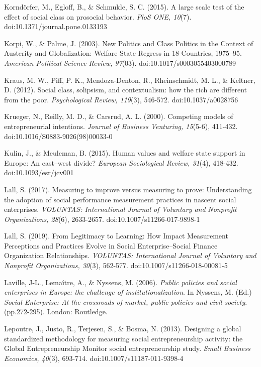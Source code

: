 \documentclass{article}
\begin{document}
Korndörfer, M., Egloff, B., \& Schmukle, S. C. (2015). A large scale test of the effect of social class on prosocial behavior. \emph{PloS}\emph{ ONE, 10}(7). doi:10.1371/journal.pone.0133193

Korpi, W., \& Palme, J. (2003). New Politics and Class Politics in the Context of Austerity and Globalization: Welfare State Regress in 18 Countries, 1975--95. \emph{American Political Science Review, 97}(03). doi:10.1017/s0003055403000789

Kraus, M. W., Piff, P. K., Mendoza-Denton, R., Rheinschmidt, M. L., \& Keltner, D. (2012). Social class, solipsism, and contextualism: how the rich are different from the poor. \emph{Psychological Review, 119}(3), 546-572. doi:10.1037/a0028756

Krueger, N., Reilly, M. D., \& Carsrud, A. L. (2000). Competing models of entrepreneurial intentions. \emph{Journal of Business Venturing, 15}(5-6), 411-432. doi:10.1016/S0883-9026(98)00033-0

Kulin, J., \& Meuleman, B. (2015). Human values and welfare state support in Europe: An east--west divide? \emph{European Sociological Review, 31}(4), 418-432. doi:10.1093/esr/jcv001

Lall, S. (2017). Measuring to improve versus measuring to prove: Understanding the adoption of social performance measurement practices in nascent social enterprises. \emph{VOLUNTAS: International Journal of Voluntary and }\emph{Nonprofit}\emph{ Organizations, 28}(6), 2633-2657. doi:10.1007/s11266-017-9898-1

Lall, S. (2019). From Legitimacy to Learning: How Impact Measurement Perceptions and Practices Evolve in Social Enterprise--Social Finance Organization Relationships. \emph{VOLUNTAS: International Journal of Voluntary and }\emph{Nonprofit}\emph{ Organizations, 30}(3), 562-577. doi:10.1007/s11266-018-00081-5

Laville, J-L., Lemaître, A., \& Nyssens, M. (2006). \emph{Public policies and social enterprises in Europe: the challenge of institutionalization}. In Nyssens, M. (Ed.) \emph{Social Enterprise: At the crossroads of market, public policies and civil society}. (pp.272-295). London: Routledge.

Lepoutre, J., Justo, R., Terjesen, S., \& Bosma, N. (2013). Designing a global standardized methodology for measuring social entrepreneurship activity: the Global Entrepreneurship Monitor social entrepreneurship study. \emph{Small Business Economics, 40}(3), 693-714. doi:10.1007/s11187-011-9398-4
\end{document}
